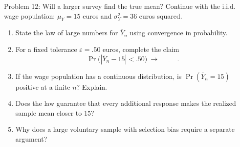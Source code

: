 \documentclass[notes,10pt, aspectratio=169]{beamer}
\newif\ifshowsolutions
\newcommand{\answerpart}[1]{\textcolor{blue}{\textbf{#1.}}\,}
\begin{document}
\begin{frame}{Problem 12: Will a larger survey find the true mean?}
Continue with the i.i.d. wage population: $\mu_Y=15$ euros and $\sigma_Y^2=36$ euros squared.
\begin{enumerate}
\setlength{\itemsep}{9pt}
\item State the law of large numbers for $\overline Y_n$ using convergence in probability.
\item For a fixed tolerance $\varepsilon=.50$ euros, complete the claim
\[
\Pr\bigl(|\overline Y_n-15|<.50\bigr)\ \longrightarrow\ \underline{\hspace{1cm}}.
\]
\item If the wage population has a continuous distribution, is $\Pr(\overline Y_n=15)$ positive at a finite $n$? Explain.
\item Does the law guarantee that every additional response makes the realized sample mean closer to 15?
\item Why does a large voluntary sample with selection bias require a separate argument?
\end{enumerate}
\end{frame}

\ifshowsolutions
\begin{frame}{Solution 12: What the law of large numbers says}
\small
\answerpart{1}
For i.i.d. wages with finite mean, the law of large numbers gives
\[
\overline Y_n\xrightarrow{p}15
\quad\Longleftrightarrow\quad
\Pr\bigl(|\overline Y_n-15|<\varepsilon\bigr)\longrightarrow1
\quad\text{for every fixed }\varepsilon>0.
\]
\answerpart{2}The blank for the tolerance $.50$ euros is therefore \textbf{1}.
\begin{itemize}
\setlength{\itemsep}{10pt}
\item \answerpart{3}With independent draws from a continuous wage distribution, $\overline Y_n$ is continuous, so $\Pr(\overline Y_n=15)=0$ at every finite $n$.
\item \answerpart{4}The convergence statement concerns probabilities of \emph{neighborhoods} of 15. It does not require exact equality or a realized average that improves after every response.
\item \answerpart{5}A selected sample can obey an LLN for its own population. For example, if volunteer wages are i.i.d. with mean $\mu_{\mathrm{vol}}\ne15$, then
\[
\overline Y_{n,\mathrm{vol}}\xrightarrow{p}\mu_{\mathrm{vol}},
\]
so a large sample alone does not establish convergence to the target mean.
\end{itemize}
\end{frame}
\fi
\end{document}
